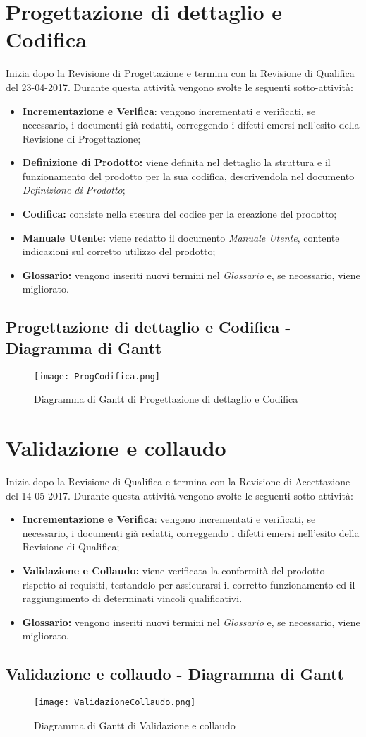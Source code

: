 \documentclass[./PianodiProgetto.tex]{subfiles}
\begin{document}
	\section{Progettazione di dettaglio e Codifica}
	Inizia dopo la Revisione di Progettazione e termina con la Revisione di Qualifica del 23-04-2017. Durante questa attività vengono svolte le seguenti sotto-attività:
	\begin{itemize}
		\item \textbf{Incrementazione e Verifica}: vengono incrementati e verificati, se necessario, i documenti già redatti, correggendo i difetti emersi nell'esito della Revisione di Progettazione;	
		\item \textbf{Definizione di Prodotto:} viene definita nel dettaglio la struttura e il funzionamento del prodotto per la sua codifica, descrivendola nel documento \textit{Definizione di Prodotto};
		\item \textbf{Codifica:} consiste nella stesura del codice per la creazione del prodotto;
		\item \textbf{Manuale Utente:} viene redatto il documento \textit{Manuale Utente}, contente indicazioni sul corretto utilizzo del prodotto; 
		\item \textbf{Glossario:} vengono inseriti nuovi termini nel \textit{Glossario} e, se necessario, viene migliorato.
	\end{itemize}
	\subsection{Progettazione di dettaglio e Codifica - Diagramma di Gantt}
	\begin{figure}[H]
		\texttt{[image: ProgCodifica.png]}	
		\caption{Diagramma di Gantt di Progettazione di dettaglio e Codifica}\label{fig:4}	
	\end{figure}
	
	\section{Validazione e collaudo}
	Inizia dopo la Revisione di Qualifica e termina con la Revisione di Accettazione del 14-05-2017. Durante questa attività vengono svolte le seguenti sotto-attività:
	\begin{itemize}
		\item \textbf{Incrementazione e Verifica}: vengono incrementati e verificati, se necessario, i documenti già redatti, correggendo i difetti emersi nell'esito della Revisione di Qualifica;		
		\item \textbf{Validazione e Collaudo:} viene verificata la conformità del prodotto rispetto ai requisiti, testandolo per assicurarsi il corretto funzionamento ed il raggiungimento di determinati vincoli qualificativi.
		\item \textbf{Glossario:} vengono inseriti nuovi termini nel \textit{Glossario} e, se necessario, viene migliorato.
	\end{itemize}
	\subsection{Validazione e collaudo - Diagramma di Gantt}
	\begin{figure}[H]
		\texttt{[image: ValidazioneCollaudo.png]}	
		\caption{Diagramma di Gantt di Validazione e collaudo}\label{fig:5}	
	\end{figure}
\end{document}
